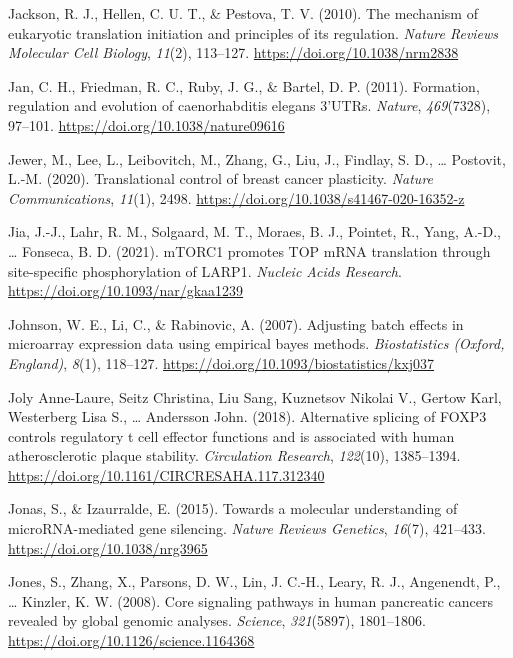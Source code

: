 \documentclass[12pt,openany]{book}
\begin{document}
\hypertarget{ref-Jackson2010}{}
Jackson, R. J., Hellen, C. U. T., \& Pestova, T. V. (2010). The
mechanism of eukaryotic translation initiation and principles of its
regulation. \emph{Nature Reviews Molecular Cell Biology}, \emph{11}(2),
113--127. \url{https://doi.org/10.1038/nrm2838}

\hypertarget{ref-Jan2011}{}
Jan, C. H., Friedman, R. C., Ruby, J. G., \& Bartel, D. P. (2011).
Formation, regulation and evolution of caenorhabditis elegans 3'UTRs.
\emph{Nature}, \emph{469}(7328), 97--101.
\url{https://doi.org/10.1038/nature09616}

\hypertarget{ref-Jewer2020}{}
Jewer, M., Lee, L., Leibovitch, M., Zhang, G., Liu, J., Findlay, S. D.,
\ldots{} Postovit, L.-M. (2020). Translational control of breast cancer
plasticity. \emph{Nature Communications}, \emph{11}(1), 2498.
\url{https://doi.org/10.1038/s41467-020-16352-z}

\hypertarget{ref-Jia2021}{}
Jia, J.-J., Lahr, R. M., Solgaard, M. T., Moraes, B. J., Pointet, R.,
Yang, A.-D., \ldots{} Fonseca, B. D. (2021). mTORC1 promotes TOP mRNA
translation through site-specific phosphorylation of LARP1.
\emph{Nucleic Acids Research}.
\url{https://doi.org/10.1093/nar/gkaa1239}

\hypertarget{ref-Johnson2007}{}
Johnson, W. E., Li, C., \& Rabinovic, A. (2007). Adjusting batch effects
in microarray expression data using empirical bayes methods.
\emph{Biostatistics (Oxford, England)}, \emph{8}(1), 118--127.
\url{https://doi.org/10.1093/biostatistics/kxj037}

\hypertarget{ref-JolyAnne-Laure2018}{}
Joly Anne-Laure, Seitz Christina, Liu Sang, Kuznetsov Nikolai V., Gertow
Karl, Westerberg Lisa S., \ldots{} Andersson John. (2018). Alternative
splicing of FOXP3 controls regulatory t cell effector functions and is
associated with human atherosclerotic plaque stability.
\emph{Circulation Research}, \emph{122}(10), 1385--1394.
\url{https://doi.org/10.1161/CIRCRESAHA.117.312340}

\hypertarget{ref-Jonas2015}{}
Jonas, S., \& Izaurralde, E. (2015). Towards a molecular understanding
of microRNA-mediated gene silencing. \emph{Nature Reviews Genetics},
\emph{16}(7), 421--433. \url{https://doi.org/10.1038/nrg3965}

\hypertarget{ref-Jones2008}{}
Jones, S., Zhang, X., Parsons, D. W., Lin, J. C.-H., Leary, R. J.,
Angenendt, P., \ldots{} Kinzler, K. W. (2008). Core signaling pathways
in human pancreatic cancers revealed by global genomic analyses.
\emph{Science}, \emph{321}(5897), 1801--1806.
\url{https://doi.org/10.1126/science.1164368}
\end{document}
